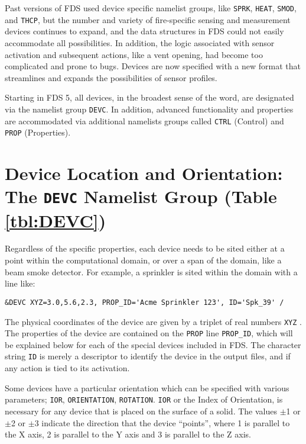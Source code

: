 \documentclass[11pt]{book}
\newcommand{\ct}{\tt\small}
\begin{document}
Past versions of FDS used device specific namelist groups, like {\ct SPRK},
{\ct HEAT}, {\ct SMOD}, and {\ct THCP}, but the number and variety
of fire-specific sensing and measurement devices continues to expand, and
the data structures in FDS could not easily accommodate all possibilities.
In addition, the logic associated with sensor activation and
subsequent actions, like a vent opening, had become too complicated and prone to bugs.
Devices are now specified with a new format that streamlines and expands the possibilities of sensor profiles.

Starting in FDS 5, all devices, in the broadest sense of the word,
are designated via the namelist group {\ct DEVC}.
In addition, advanced functionality and properties are accommodated
via additional namelists groups called {\ct CTRL} (Control) and
{\ct PROP} (Properties).




\section{Device Location and Orientation: The \texorpdfstring{{\tt DEVC}}{DEVC} Namelist Group (Table \ref{tbl:DEVC})}
\label{info:DEVC}  

Regardless of the specific properties, each device needs to be sited either at a point within the computational domain, or
over a span of the domain, like a beam smoke detector. For example, a sprinkler is sited within the domain with a line like:

\footnotesize
\begin{verbatim}
&DEVC XYZ=3.0,5.6,2.3, PROP_ID='Acme Sprinkler 123', ID='Spk_39' /
\end{verbatim}
\normalsize

\noindent
The physical coordinates of the
device are given by a triplet of real numbers {\ct XYZ} .
The properties of the device are contained on the {\ct PROP} line
{\ct PROP\_ID}, which will be explained below for each of the
special devices included in FDS.
The character string {\ct ID} is merely a descriptor to identify the
device in the output files, and if any action is tied to its activation.

Some devices have a particular orientation which can be specified
with various parameters; {\ct IOR}, {\ct ORIENTATION}, {\ct ROTATION}.
{\ct IOR} or the Index of Orientation, is necessary for any device that is
placed on the surface of a solid. The values $\pm$1 or $\pm$2 or $\pm$3 indicate the direction
that the device ``points'', where 1 is parallel to the X axis, 2 is parallel to the Y axis
and 3 is parallel to the Z axis.
\end{document}
